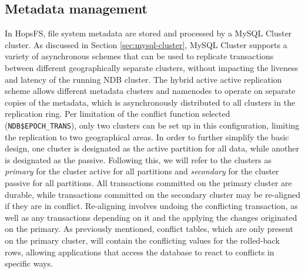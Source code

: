 \subsection{Metadata management}
In HopsFS, file system metadata are stored and processed by a MySQL Cluster cluster.
As discussed in Section \ref{sec:mysql-cluster}, MySQL Cluster supports a variety of asynchronous schemes that can be used to replicate transactions between different geographically separate clusters, without impacting the liveness and latency of the running NDB cluster.
The hybrid active active replication scheme allows different metadata clusters and namenodes to operate on separate copies of the metadata, which is asynchronously distributed to all clusters in the replication ring.
Per limitation of the conflict function selected (\texttt{NDB\$EPOCH\_TRANS}), only two clusters can be set up in this configuration, limiting the replication to two geographical areas.
In order to further simplify the basic design, one cluster is designated as the active partition for all data, while another is designated as the passive.
Following this, we will refer to the clusters as \emph{primary} for the cluster active for all partitions and \emph{secondary} for the cluster passive for all partitions. 
All transactions committed on the primary cluster are durable, while transactions committed on the secondary cluster may be re-aligned if they are in conflict.
Re-aligning involves undoing the conflicting transaction, as well as any transactions depending on it and the applying the changes originated on the primary.
As previously mentioned, conflict tables, which are only present on the primary cluster, will contain the conflicting values for the rolled-back rows, allowing applications that access the database to react to conflicts in specific ways.

